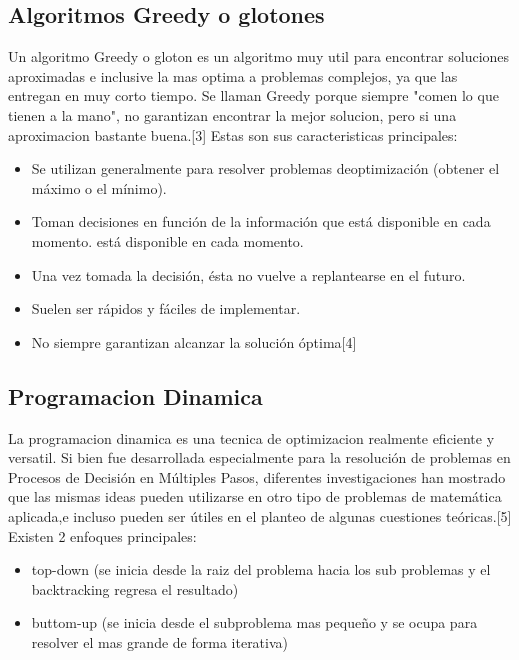 \documentclass[spanish]{article}
\begin{document}
	\subsection{Algoritmos Greedy o glotones}	
	Un algoritmo Greedy o gloton es un algoritmo muy util para encontrar soluciones aproximadas e inclusive la mas optima a problemas complejos, ya que las entregan en muy corto tiempo. Se llaman Greedy porque siempre "comen lo que tienen a la mano", no garantizan encontrar la mejor solucion, pero si una aproximacion bastante buena.[3]
	Estas son sus caracteristicas principales:
	\begin{itemize}
		\item Se utilizan generalmente para resolver problemas deoptimización (obtener el máximo o el mínimo).
		\item Toman decisiones en función de la información que está disponible en cada momento. está disponible en cada momento.
		\item Una vez tomada la decisión, ésta no vuelve a replantearse en el futuro.
		\item Suelen ser rápidos y fáciles de implementar.
		\item No siempre garantizan alcanzar la solución óptima[4]
	\end{itemize}
	\subsection{Programacion Dinamica}
	La programacion dinamica es una tecnica de optimizacion realmente eficiente y versatil. Si bien fue desarrollada especialmente para la resolución de problemas en Procesos de Decisión en Múltiples Pasos, diferentes investigaciones han mostrado que las mismas ideas pueden utilizarse en otro tipo de problemas de matemática aplicada,e incluso pueden ser útiles en el planteo de algunas cuestiones teóricas.[5]
	Existen 2 enfoques principales:
	\begin{itemize}
		\item top-down (se inicia desde la raiz del problema hacia los sub problemas y el backtracking regresa el resultado)
		\item buttom-up (se inicia desde el subproblema mas pequeño y se ocupa para resolver el mas grande de forma iterativa)
	\end{itemize}
\end{document}
